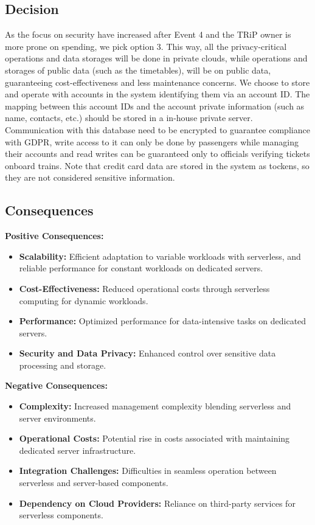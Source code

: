 \subsection*{Decision}
As the focus on security have increased after Event 4 and the TRiP owner is more prone on spending, we pick option 3. This way, all the privacy-critical operations and data storages will be done in private clouds, while operations and storages of public data (such as the timetables),
will be on public data, guaranteeing cost-effectiveness and less maintenance concerns.
We choose to store and operate with accounts in the system identifying them via an account ID. The mapping between this account IDs and the account private information (such as name, contacts, etc.) should be stored in a in-house private server.
Communication with this database need to be encrypted to guarantee compliance with GDPR, write access to it can only be done by passengers while managing their accounts and read writes can be guaranteed only to officials verifying tickets onboard trains.
Note that credit card data are stored in the system as tockens, so they are not considered sensitive information.

\subsection*{Consequences}
\textbf{Positive Consequences:}
\begin{itemize}
    \item \textbf{Scalability:} Efficient adaptation to variable workloads with serverless, and reliable performance for constant workloads on dedicated servers.
    \item \textbf{Cost-Effectiveness:} Reduced operational costs through serverless computing for dynamic workloads.
    \item \textbf{Performance:} Optimized performance for data-intensive tasks on dedicated servers.
    \item \textbf{Security and Data Privacy:} Enhanced control over sensitive data processing and storage.
\end{itemize}

\textbf{Negative Consequences:}
\begin{itemize}
    \item \textbf{Complexity:} Increased management complexity blending serverless and server environments.
    \item \textbf{Operational Costs:} Potential rise in costs associated with maintaining dedicated server infrastructure.
    \item \textbf{Integration Challenges:} Difficulties in seamless operation between serverless and server-based components.
    \item \textbf{Dependency on Cloud Providers:} Reliance on third-party services for serverless components.
\end{itemize}
